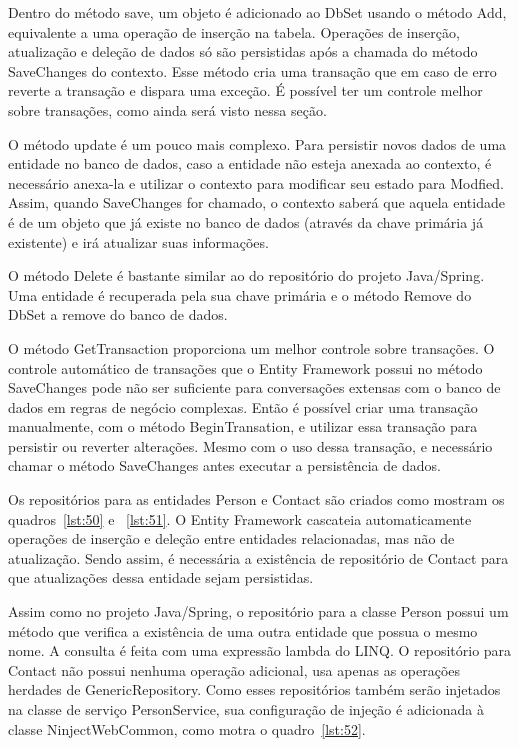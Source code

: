 \documentclass[a4paper,12pt]{article}
\newcommand{\sharpcode}[3] {
	
	\FloatBarrier
}
\begin{document}
Dentro do método save, um objeto é adicionado ao DbSet usando o método Add, equivalente a uma operação de inserção na tabela. Operações de inserção, atualização e deleção de dados só são persistidas após a chamada do método SaveChanges do contexto. Esse método cria uma transação que em caso de erro reverte a transação e dispara uma exceção. É possível ter um controle melhor sobre transações, como ainda será visto nessa seção.

O método update é um pouco mais complexo. Para persistir novos dados de uma entidade no banco de dados, caso a entidade não esteja anexada ao contexto, é necessário anexa-la e utilizar o contexto para modificar seu estado para Modfied. Assim, quando SaveChanges for chamado, o contexto saberá que aquela entidade é de um objeto que já existe no banco de dados (através da chave primária já existente) e irá atualizar suas informações.

O método Delete é bastante similar ao do repositório do projeto Java/Spring. Uma entidade é recuperada pela sua chave primária e o método Remove do DbSet a remove do banco de dados.

O método GetTransaction proporciona um melhor controle sobre transações. O controle automático de transações que o Entity Framework possui no método SaveChanges pode não ser suficiente para conversações extensas com o banco de dados em regras de negócio complexas. Então é possível criar uma transação manualmente, com o método BeginTransation, e utilizar essa transação para persistir ou reverter alterações. Mesmo com o uso dessa transação, e necessário chamar o método SaveChanges antes executar a persistência de dados.

Os repositórios para as entidades Person e Contact são criados como mostram os quadros~\ref{lst:50} e ~\ref{lst:51}. O Entity Framework cascateia automaticamente operações de inserção e deleção entre entidades relacionadas, mas não de atualização. Sendo assim, é necessária a existência de repositório de Contact para que atualizações dessa entidade sejam persistidas.

\sharpcode{code/50.txt}{Interfaces IPersonRepository e IContactRepository}{lst:50}

\sharpcode{code/51.txt}{Classes PersonRepository e ContactRepository}{lst:51}

Assim como no projeto Java/Spring, o repositório para a classe Person possui um método que verifica a existência de uma outra entidade que possua o mesmo nome. A consulta é feita com uma expressão lambda do LINQ. O repositório para Contact não possui nenhuma operação adicional, usa apenas as operações herdades de GenericRepository. Como esses repositórios também serão injetados na classe de serviço PersonService, sua configuração de injeção é adicionada à classe NinjectWebCommon, como motra o quadro~\ref{lst:52}.
\end{document}
